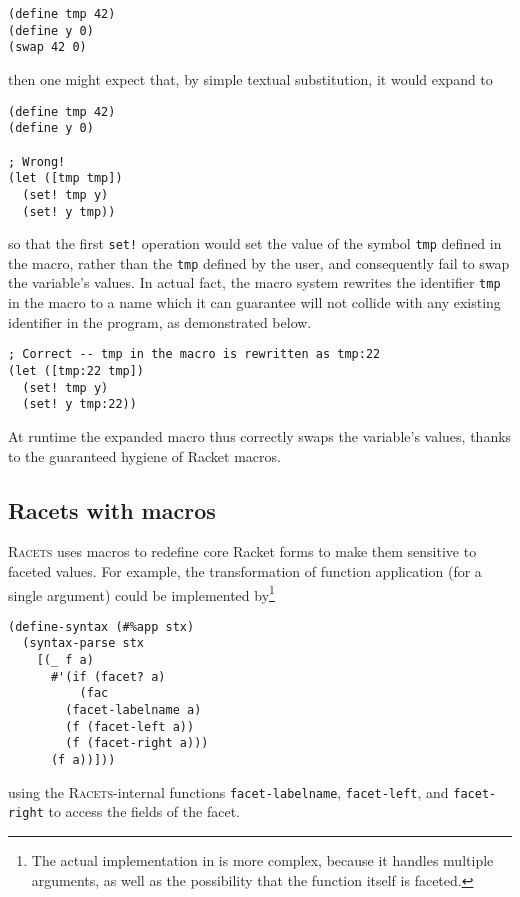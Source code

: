 \documentclass{article}
\begin{document}
\begin{lstlisting}
(define tmp 42)
(define y 0)
(swap 42 0)
\end{lstlisting}

\noindent then one might expect that, by simple textual substitution, it would expand to

\begin{lstlisting}
(define tmp 42)
(define y 0)

; Wrong!
(let ([tmp tmp])
  (set! tmp y)
  (set! y tmp))
\end{lstlisting}

\noindent so that the first \texttt{set!} operation would set the value of the symbol \texttt{tmp} defined in the macro, rather than the \texttt{tmp} defined by the user, and consequently fail to swap the variable's values. In actual fact, the macro system rewrites the identifier \texttt{tmp} in the macro to a name which it can guarantee will not collide with any existing identifier in the program, as demonstrated below.

\begin{lstlisting}
; Correct -- tmp in the macro is rewritten as tmp:22
(let ([tmp:22 tmp])
  (set! tmp y)
  (set! y tmp:22))
\end{lstlisting}

At runtime the expanded macro thus correctly swaps the variable's values, thanks to the guaranteed hygiene of Racket macros.


\subsection{Racets with macros}
\textsc{Racets} uses macros to redefine core Racket forms to make them sensitive to faceted values. For example, the transformation of function application (for a single argument) could be implemented by\footnote{The actual implementation in \cite{racets} is more complex, because it handles multiple arguments, as well as the possibility that the function itself is faceted.}

\begin{lstlisting}
(define-syntax (#%app stx)
  (syntax-parse stx
    [(_ f a)
      #'(if (facet? a)
          (fac
	    (facet-labelname a)
	    (f (facet-left a))
	    (f (facet-right a)))
	  (f a))]))
\end{lstlisting}

\noindent using the \textsc{Racets}-internal functions \texttt{facet-labelname}, \texttt{facet-left}, and \texttt{facet-right} to access the fields of the facet.
\end{document}
